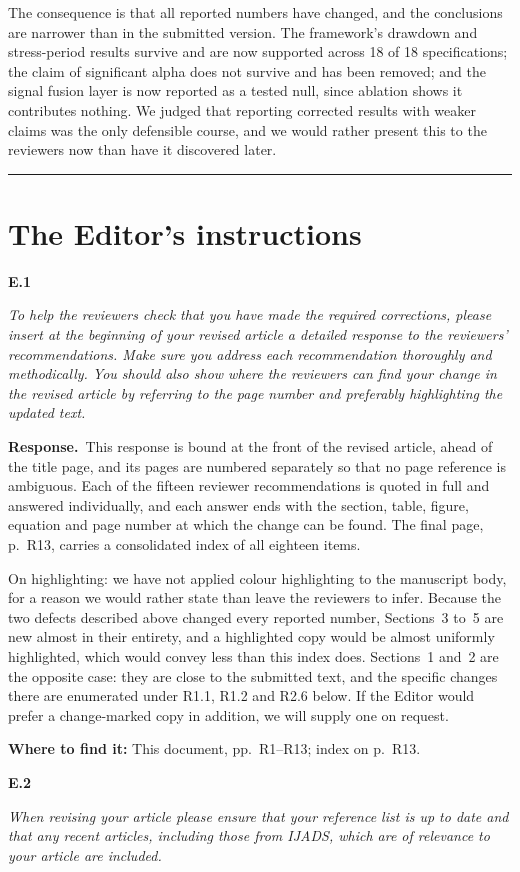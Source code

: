 \documentclass[11pt,a4paper]{article}
\newcommand{\rc}[2]{%
  \par\medskip\noindent
  \colorbox{qbg}{\parbox{\dimexpr\linewidth-2\fboxsep}{%
  \textbf{#1}\par\smallskip\itshape #2}}\par\nopagebreak}
\newcommand{\resp}{\par\medskip\noindent\textbf{Response.}\ }
\newcommand{\where}[1]{\par\smallskip\noindent\textcolor{blue!55!black}{\textbf{Where to find it:} #1}\par}
\begin{document}
The consequence is that all reported numbers have changed, and the conclusions are
narrower than in the submitted version. The framework's drawdown and stress-period results
survive and are now supported across 18 of 18 specifications; the claim of significant
alpha does not survive and has been removed; and the signal fusion layer is now reported as
a tested null, since ablation shows it contributes nothing. We judged that reporting
corrected results with weaker claims was the only defensible course, and we would rather
present this to the reviewers now than have it discovered later.

\bigskip
\noindent\rule{\linewidth}{1pt}
\section*{The Editor's instructions}

\rc{E.1}{To help the reviewers check that you have made the required corrections, please
insert at the beginning of your revised article a detailed response to the reviewers'
recommendations. Make sure you address each recommendation thoroughly and methodically.
You should also show where the reviewers can find your change in the revised article by
referring to the page number and preferably highlighting the updated text.}

\resp This response is bound at the front of the revised article, ahead of the title page,
and its pages are numbered separately so that no page reference is ambiguous. Each of the
fifteen reviewer recommendations is quoted in full and answered individually, and each
answer ends with the section, table, figure, equation and page number at which the change
can be found. The final page, p.~R13, carries a consolidated index of all eighteen items.

On highlighting: we have not applied colour highlighting to the manuscript body, for a
reason we would rather state than leave the reviewers to infer. Because the two defects
described above changed every reported number, Sections~3 to~5 are new almost in their
entirety, and a highlighted copy would be almost uniformly highlighted, which would convey
less than this index does. Sections~1 and~2 are the opposite case: they are close to the
submitted text, and the specific changes there are enumerated under R1.1, R1.2 and R2.6
below. If the Editor would prefer a change-marked copy in addition, we will supply one on
request.
\where{This document, pp.~R1--R13; index on p.~R13.}

\rc{E.2}{When revising your article please ensure that your reference list is up to date
and that any recent articles, including those from IJADS, which are of relevance to your
article are included.}
\end{document}
